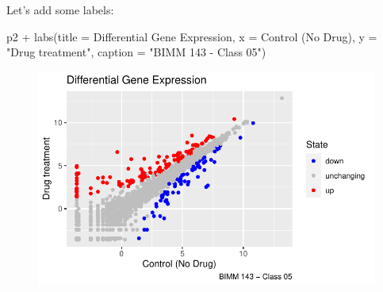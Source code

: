 \documentclass[
  letterpaper,
  DIV=11,
  numbers=noendperiod]{scrartcl}
\newenvironment{Shaded}{\begin{snugshade}}{\end{snugshade}}
\newcommand{\AttributeTok}[1]{\textcolor[rgb]{0.40,0.45,0.13}{#1}}
\newcommand{\FunctionTok}[1]{\textcolor[rgb]{0.28,0.35,0.67}{#1}}
\newcommand{\NormalTok}[1]{\textcolor[rgb]{0.00,0.23,0.31}{#1}}
\newcommand{\SpecialCharTok}[1]{\textcolor[rgb]{0.37,0.37,0.37}{#1}}
\newcommand{\StringTok}[1]{\textcolor[rgb]{0.13,0.47,0.30}{#1}}
\begin{document}
Let's add some labels:

\begin{Shaded}
\begin{Highlighting}[]
\NormalTok{p2 }\SpecialCharTok{+} \FunctionTok{labs}\NormalTok{(}\AttributeTok{title =} \StringTok{\textquotesingle{}Differential Gene Expression\textquotesingle{}}\NormalTok{, }
          \AttributeTok{x =} \StringTok{\textquotesingle{}Control (No Drug)\textquotesingle{}}\NormalTok{,}
          \AttributeTok{y =} \StringTok{"Drug treatment"}\NormalTok{,}
          \AttributeTok{caption =} \StringTok{"BIMM 143 {-} Class 05"}\NormalTok{)}
\end{Highlighting}
\end{Shaded}

\begin{figure}[H]

{\centering \includegraphics{class05_files/figure-pdf/unnamed-chunk-13-1.pdf}

}

\end{figure}
\end{document}

